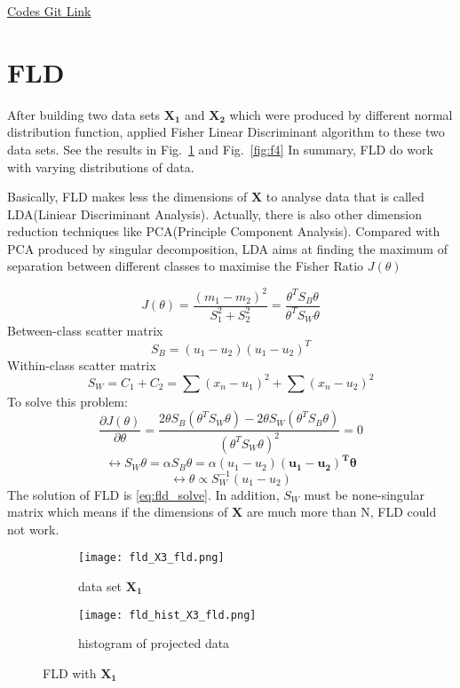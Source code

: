 \documentclass[11pt]{article}
\begin{document}
\href{https://github.com/pipipiapia/machine_learing_foundation/blob/617c439ad7e2d1e40603feca24b0f88e03ac51a0/lab_1/perceptron.ipynb}{Codes Git Link}



\section{FLD}
After building two data sets $\bm{X_1}$ and $\bm{X_2}$ which were produced by different normal distribution function, applied Fisher Linear Discriminant algorithm to these two data sets. See the results in Fig.~\ref{fig:f3} and Fig.~\ref{fig:f4} In summary, FLD do work with varying distributions of data.

Basically, FLD makes less the dimensions of $\bm{X}$ to analyse data that is called LDA(Liniear Discriminant Analysis). Actually, there is also other dimension reduction techniques like PCA(Principle Component Analysis). Compared with PCA produced by singular decomposition, LDA aims at finding the maximum of separation between different classes to maximise the Fisher Ratio $J(\theta)$

\[J(\theta)=\frac{(m_1-m_2)^2}{S_1^2+S_2^2}=\frac{\theta^T S_B \theta}{\theta^T S_W \theta}\]
Between-class scatter matrix
\[S_B = (u_1 - u_2)(u_1 - u_2)^T \] 
 Within-class scatter matrix
\[S_W = C_1 + C_2 = \sum(x_n - u_1)^2 + \sum(x_n-u_2)^2 \] 
To solve this problem:
\[\frac{\partial{J(\theta)}}{\partial{\theta}} = \frac{2\theta S_B(\theta^T S_W \theta) - 2 \theta S_W(\theta^T S_B \theta)}{(\theta^T S_W \theta)^2} = 0\]
\[  \leftrightarrow S_W\theta = \alpha S_B \theta = \alpha (u_1 - u_2)\bm{(u_1 - u_2)^T \theta} \]
\begin{equation}\label{eq:fld_solve}
\leftrightarrow \theta \propto S_W^{-1} (u_1 - u_2) 
\end{equation}
The solution of FLD is \eqref{eq:fld_solve}. In addition, $S_W$ must be none-singular matrix which means if the dimensions of $\bm{X}$ are much more than N, FLD could not work.




\begin{figure}[h]
\centering
\begin{subfigure}{0.3\textwidth}
\texttt{[image: fld\_X3\_fld.png]}
\caption{data set  $\bm{X_1}$ }
\end{subfigure}
\begin{subfigure}{0.3\textwidth}
\texttt{[image: fld\_hist\_X3\_fld.png]}
\caption{histogram of projected data}
\end{subfigure}
\caption{FLD with $\bm{X_1}$ }
\label{fig:f3}
\end{figure}
\end{document}

